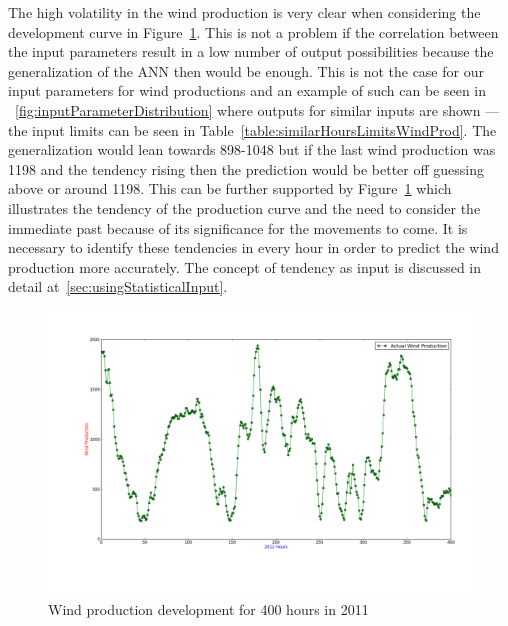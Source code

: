 The high volatility in the wind production is very clear when considering the development curve in Figure~\ref{fig:windHourDevelopment400Hours}. This is not a problem if the correlation between the input parameters result in a low number of output possibilities because the generalization of the ANN then would be enough. This is not the case for our input parameters for wind productions and an example of such can be seen in ~\ref{fig:inputParameterDistribution} where outputs for similar inputs are shown --- the input limits can be seen in Table~\ref{table:similarHoursLimitsWindProd}. The generalization would lean towards 898-1048 but if the last wind production was 1198 and the tendency rising then the prediction would be better off guessing above or around 1198. This can be further supported by Figure~\ref{fig:windHourDevelopment400Hours} which illustrates the tendency of the production curve and the need to consider the immediate past because of its significance for the movements to come. It is necessary to identify these tendencies in every hour in order to predict the wind production more accurately. The concept of tendency as input is discussed in detail at~\ref{sec:usingStatisticalInput}.

\begin{figure}[H]
\centering
\includegraphics[width=0.99\linewidth,natwidth=898,natheight=587]{billeder/productionTendency400Hours.png}
\caption{Wind production development for 400 hours in 2011}
\label{fig:windHourDevelopment400Hours}
\end{figure}

